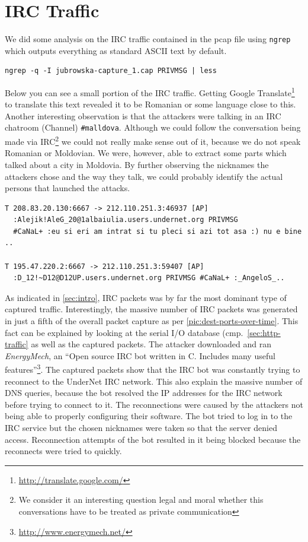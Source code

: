 \documentclass[a4paper,
    11pt,
    normalheadings,
    parindent,
    UKenglish,
    abstracton,
    ]{scrartcl}
\begin{document}
\section{IRC Traffic} \label{sec:irc-traffic}
We did some analysis on the IRC traffic contained in the pcap file using \texttt{ngrep} which outputs everything as standard ASCII text by default.

\begin{verbatim}
ngrep -q -I jubrowska-capture_1.cap PRIVMSG | less
\end{verbatim}

Below you can see a small portion of the IRC traffic.
Getting Google Translate\footnote{\url{http://translate.google.com/}} to translate this text revealed it to be Romanian or some language close to this.
Another interesting observation is that the attackers were talking in an IRC chatroom (Channel) \texttt{\#malldova}.
Although we could follow the conversation being made via IRC\footnote{We consider it an interesting question legal and moral whether this conversations have to be treated as private communication} we could not really make sense out of it, because we do not speak Romanian or Moldovian.
We were, however, able to extract some parts which talked about a city in Moldovia.
By further observing the nicknames the attackers chose and the way they talk, we could probably identify the actual persons that launched the attacks.


\begin{verbatim}
T 208.83.20.130:6667 -> 212.110.251.3:46937 [AP]
  :Alejik!AleG_20@1albaiulia.users.undernet.org PRIVMSG
  #CaNaL+ :eu si eri am intrat si tu pleci si azi tot asa :) nu e bine ..

T 195.47.220.2:6667 -> 212.110.251.3:59407 [AP]
  :D_12!~D12@D12UP.users.undernet.org PRIVMSG #CaNaL+ :_AngeloS_..
\end{verbatim}



As indicated in \autoref{sec:intro}, IRC packets was by far the most dominant type of captured traffic.
Interestingly, the massive number of IRC packets was generated in just a fifth of the overall packet capture as per \autoref{pic:dest-ports-over-time}.
This fact can be explained by looking at the serial I/O database (cmp.\, \autoref{sec:http-traffic} as well as the captured packets.
The attacker downloaded and ran \emph{EnergyMech}, an ``Open source IRC bot written in C. Includes many useful features''\footnote{\url{http://www.energymech.net/}}.
The captured packets show that the IRC bot was constantly trying to reconnect to the UnderNet IRC network.
This also explain the massive number of DNS queries, because the bot resolved the IP addresses for the IRC network before trying to connect to it.
The reconnections were caused by the attackers not being able to properly configuring their software.
The bot tried to log in to the IRC service but the chosen nicknames were taken so that the server denied access.
Reconnection attempts of the bot resulted in it being blocked because the reconnects were tried to quickly.
\end{document}
